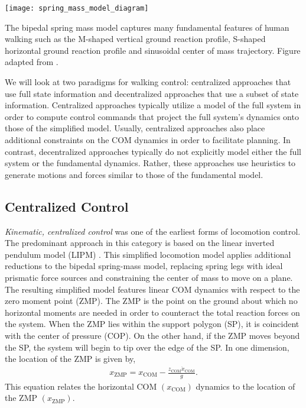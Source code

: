 \begin{marginfigure}
    \centering
    \texttt{[image: spring\_mass\_model\_diagram]}
    \caption{The bipedal spring mass model captures many fundamental features of
    human walking such as the M-shaped vertical ground reaction profile,
    S-shaped horizontal ground reaction profile and sinusoidal center of mass
    trajectory. Figure adapted from \citet{geyer2006compliant}.}
    \label{fig:ssm_diagram}
\end{marginfigure}

We will look at two paradigms for walking control: centralized approaches that
use full state information and decentralized approaches that use a subset of
state information. Centralized approaches typically utilize a model of the full
system in order to compute control commands that project the full system's
dynamics onto those of the simplified model. Usually, centralized approaches
also place additional constraints on the COM dynamics in order to facilitate
planning. In contrast, decentralized approaches typically do not explicitly
model either the full system or the fundamental dynamics. Rather, these
approaches use heuristics to generate motions and forces similar to those of the
fundamental model.

\subsection{Centralized Control}\label{sec:back_centralized_control}

\emph{Kinematic, centralized control} was one of the earliest forms of locomotion
control. The predominant approach in this category is based on the linear
inverted pendulum model (LIPM) \citep{kajita1991study, kajita20013d}. This
simplified locomotion model applies additional reductions to the bipedal
spring-mass model, replacing spring legs with ideal prismatic force sources and
constraining the center of mass to move on a plane. The resulting simplified
model features linear COM dynamics with respect to the zero moment point (ZMP).
The ZMP is the point on the ground about which no horizontal moments are needed
in order to counteract the total reaction forces on the system. When the ZMP
lies within the support polygon (SP), it is coincident with the center of pressure (COP). On the other
hand, if the ZMP moves beyond the SP, the system will begin to tip
over the edge of the SP. In one dimension, the location of the ZMP is given by,
\begin{align} 
    x_\textrm{ZMP} = x_\textrm{COM} - \frac{z_\textrm{COM}
        \ddot{x}_\textrm{COM}}{g}. 
    \label{eq:ZMP}
\end{align}
This equation relates the horizontal COM $(x_\textrm{COM})$ dynamics to the
location of the ZMP $(x_\textrm{ZMP})$.

